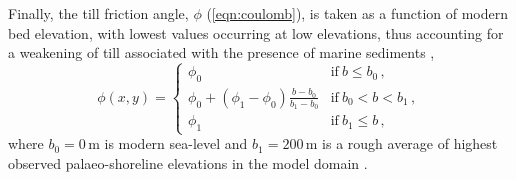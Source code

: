 \documentclass{article}
\begin{document}
Finally, the till friction angle, $\phi$ (\cref{eqn:coulomb}), is taken as a
function of modern bed
elevation, with lowest values occurring at low elevations, thus accounting for
a weakening of till associated with the presence of marine sediments
\citep[cf.][Eq.~10]{Martin.etal.2011},
\begin{equation}
    \phi(x,y) =
    \begin{cases}
        \phi_0 & \text{if}\ b \le b_0 \,, \\
        \phi_0 + (\phi_1-\phi_0) \frac{b - b_0}{b_1-b_0}
                & \text{if}\ b_0 < b < b_1 \,, \\
        \phi_1 & \text{if}\ b_1 \le b \,,
    \end{cases}
\end{equation}
where $b_0=0$\,m is modern sea-level and $b_1=200$\,m is a rough average of
highest observed palaeo-shoreline elevations in the model domain
\citep[\cref{tab:slidingparams};][]{Clague.James.2002}.
\end{document}
